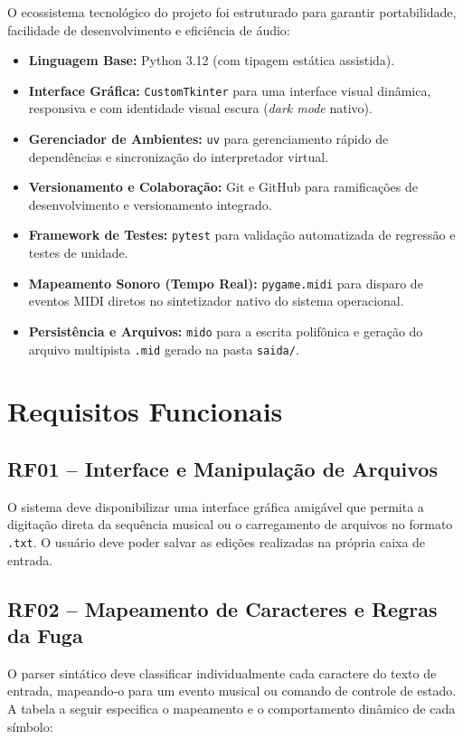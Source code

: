 \documentclass[12pt, a4paper]{article}
\begin{document}
O ecossistema tecnológico do projeto foi estruturado para garantir portabilidade, facilidade de desenvolvimento e eficiência de áudio:
\begin{itemize}[leftmargin=1.5cm]
  \item \textbf{Linguagem Base:} Python 3.12 (com tipagem estática assistida).
  \item \textbf{Interface Gráfica:} \texttt{CustomTkinter} para uma interface visual dinâmica, responsiva e com identidade visual escura (\textit{dark mode} nativo).
  \item \textbf{Gerenciador de Ambientes:} \texttt{uv} para gerenciamento rápido de dependências e sincronização do interpretador virtual.
  \item \textbf{Versionamento e Colaboração:} Git e GitHub para ramificações de desenvolvimento e versionamento integrado.
  \item \textbf{Framework de Testes:} \texttt{pytest} para validação automatizada de regressão e testes de unidade.
  \item \textbf{Mapeamento Sonoro (Tempo Real):} \texttt{pygame.midi} para disparo de eventos MIDI diretos no sintetizador nativo do sistema operacional.
  \item \textbf{Persistência e Arquivos:} \texttt{mido} para a escrita polifônica e geração do arquivo multipista \texttt{.mid} gerado na pasta \texttt{saida/}.
\end{itemize}

\section{Requisitos Funcionais}

\subsection{RF01 -- Interface e Manipulação de Arquivos}
O sistema deve disponibilizar uma interface gráfica amigável que permita a digitação direta da sequência musical ou o carregamento de arquivos no formato \texttt{.txt}. O usuário deve poder salvar as edições realizadas na própria caixa de entrada.

\subsection{RF02 -- Mapeamento de Caracteres e Regras da Fuga}
O parser sintático deve classificar individualmente cada caractere do texto de entrada, mapeando-o para um evento musical ou comando de controle de estado. A tabela a seguir especifica o mapeamento e o comportamento dinâmico de cada símbolo:
\end{document}
